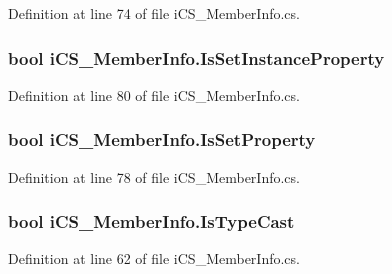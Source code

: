 Definition at line 74 of file i\+C\+S\+\_\+\+Member\+Info.\+cs.

\hypertarget{classi_c_s___member_info_ae398d9466f96b787907fd1a00f8b6e87}{
\subsubsection[{Is\+Set\+Instance\+Property}]{\setlength{\rightskip}{0pt plus 5cm}bool i\+C\+S\+\_\+\+Member\+Info.\+Is\+Set\+Instance\+Property\hspace{0.3cm}{\ttfamily [get]}}}\label{classi_c_s___member_info_ae398d9466f96b787907fd1a00f8b6e87}


Definition at line 80 of file i\+C\+S\+\_\+\+Member\+Info.\+cs.

\hypertarget{classi_c_s___member_info_ad8dfb5e00b9136415b5f0694bf6fe1f6}{
\subsubsection[{Is\+Set\+Property}]{\setlength{\rightskip}{0pt plus 5cm}bool i\+C\+S\+\_\+\+Member\+Info.\+Is\+Set\+Property\hspace{0.3cm}{\ttfamily [get]}}}\label{classi_c_s___member_info_ad8dfb5e00b9136415b5f0694bf6fe1f6}


Definition at line 78 of file i\+C\+S\+\_\+\+Member\+Info.\+cs.

\hypertarget{classi_c_s___member_info_a6b993a93e6b1984df1fffd84efa425e9}{
\subsubsection[{Is\+Type\+Cast}]{\setlength{\rightskip}{0pt plus 5cm}bool i\+C\+S\+\_\+\+Member\+Info.\+Is\+Type\+Cast\hspace{0.3cm}{\ttfamily [get]}}}\label{classi_c_s___member_info_a6b993a93e6b1984df1fffd84efa425e9}


Definition at line 62 of file i\+C\+S\+\_\+\+Member\+Info.\+cs.

